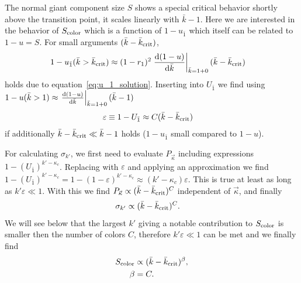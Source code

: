 \documentclass[aps, pre, onecolumn, a4paper, floatfix]{revtex4}
\begin{document}
The normal giant component size $S$ shows a special critical behavior shortly above the transition point, 
it scales linearly with $\bar{k}-1$. Here we are interested in the behavior of $S_{\rm color}$ 
which is a function of $1-u_{\bar 1}$ which itself can be related to $1-u=S$. For small arguments
$(\bar{k}-{\bar k}_{\rm crit})$, 
\begin{align}
1-u_{\bar 1}(\bar{k}>{\bar k}_{\rm crit}) &\approx 
(1-r_1)^2 \left.\frac{{\rm d}(1-u)}{{\rm d}{\bar k}}\right|_{\bar{k}=1+0} (\bar{k}-{\bar k}_{\rm crit})
\end{align}
holds due to equation~\ref{eq:u_1_solution}. Inserting into $U_{\bar 1}$ we find using 
$1-u(\bar{k}>1) \approx \left.\frac{{\rm d}(1-u)}{{\rm d}{\bar k}}\right|_{\bar{k}=1+0} (\bar{k}-1)$
\begin{align}
\varepsilon &\equiv 1 - U_{\bar 1} \approx C (\bar{k}-{\bar k}_{\rm crit})
\end{align}
if additionally $\bar{k}-{\bar k}_{\rm crit}\ll\bar{k}-1$ holds ($1-u_{\bar 1}$ small compared to 
$1-u$). 

For calculating $\sigma_{k'}$, we first need to evaluate $P_{\vec \kappa}$ including expressions 
$1-(U_{\bar 1})^{k'-\kappa_c}$. Replacing with $\varepsilon$ and applying an approximation we find 
$1-(U_{\bar 1})^{k'-\kappa_c}=1-(1-\varepsilon)^{k'-\kappa_c}\approx (k'-\kappa_c) \varepsilon$. 
This is true at least as long as $k'\varepsilon\ll 1$. With this we find 
$P_{\vec \kappa}\propto (\bar{k}-{\bar k}_{\rm crit})^C$ independent of $\vec \kappa$, and finally 
\begin{align}
\sigma_{k'} &\propto (\bar{k}-{\bar k}_{\rm crit})^C. 
\end{align}
We will see below that the largest $k'$ giving a notable contribution to $S_{\rm color}$ is 
smaller then the number of colors $C$, therefore $k'\varepsilon\ll 1$ can be met and we finally find 
\begin{align}
S_{\rm color} &\propto (\bar{k}-{\bar k}_{\rm crit})^{\beta},\\
\beta &= C.
\end{align}
\end{document}
